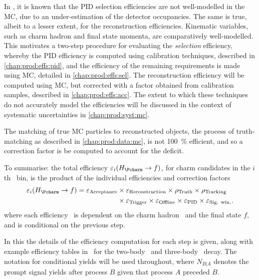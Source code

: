 In \lhcb, it is known that the \ac{PID} selection efficiencies are not 
well-modelled in the \ac{MC}, due to an under-estimation of the detector 
occupancies.
The same is true, albeit to a lesser extent, for the reconstruction 
efficiencies.
Kinematic variables, such as charm hadron and final state momenta, are 
comparatively well-modelled.
This motivates a two-step procedure for evaluating the \emph{selection} 
efficiency, whereby the \ac{PID} efficiency is computed using calibration 
techniques, described in \cref{chap:prod:effs:pid}, and the efficiency of the remaining 
requirements is made using \ac{MC}, detailed in \cref{chap:prod:effs:sel}.
The reconstruction efficiency will be computed using \ac{MC}, but corrected 
with a factor obtained from calibration samples, described in \cref{chap:prod:effs:acc}.
The extent to which these techniques do not accurately model the efficiencies 
will be discussed in the context of systematic uncertainties in 
\cref{chap:prod:syst:mc}.

The matching of true \ac{MC} particles to reconstructed objects, the process of 
truth-matching as described in \cref{chap:prod:data:mc}, is not \SI{100}{\%} 
efficient, and so a correction factor \efftruth is be computed to account for 
the deficit.

To summarise: the total efficiency $\eff_{i}(\decay{\PHc}{f})$, for charm 
candidates in the $i$th \pTy\ bin, is the product of the individual 
efficiencies and correction factors
\begin{align}
  \eff_{i}(\decay{\PHc}{f}) = \effacc &\times \effreco \times \efftruth \times \efftracking \nonumber\\
                                      &\times \efftrig \times \effoffline \times \effpid \times \effsigwin.
  \label{eqn:prod:effs:total_eff}
\end{align}
where each efficiency \eff\ is dependent on the charm hadron \PHc\ and the 
final state $f$, and is conditional on the previous step.

In this  the details of the efficiency computation for 
each step is given, along with example efficiency tables in \pTy\ for the 
two-body \DzToKpi\ and three-body \DpToKpipi\ decay.
The notation for conditional yields will be used throughout, where $N_{B|A}$ 
denotes the prompt signal yields after process $B$ given that process $A$ 
preceded $B$.

